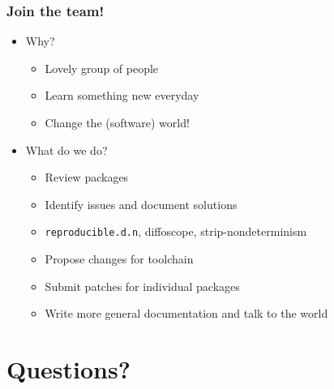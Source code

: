 \documentclass[14pt]{beamer}
\begin{document}
\begin{frame}
 \frametitle{Join the team!}

 \begin{itemize}
  \item Why?
   \begin{itemize}
    \item \heartsuit{}\heartsuit{}\heartsuit{} Lovely group of people \heartsuit{}\heartsuit{}\heartsuit{}
    \item Learn something new everyday
    \item Change the (software) world!
   \end{itemize}
  \item What do we do?
   \begin{itemize}
    \item Review packages
    \item Identify issues and document solutions
    \item \texttt{reproducible.d.n}, diffoscope, strip-nondeterminism
    \item Propose changes for toolchain
    \item Submit patches for individual packages
    \item Write more general documentation and  talk to the world
   \end{itemize}
 \end{itemize}
\end{frame}

\section{Questions?}
\end{document}
